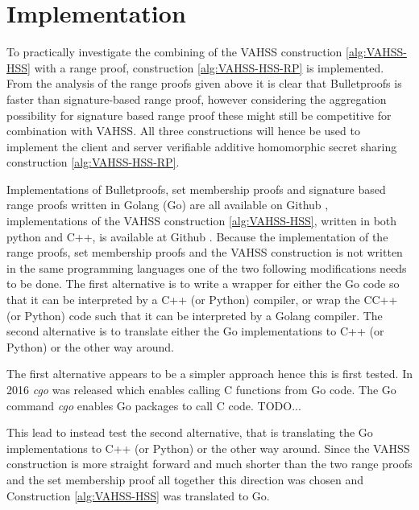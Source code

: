 \section{Implementation}
To practically investigate the combining of the VAHSS construction \ref{alg:VAHSS-HSS} with a range proof, construction \ref{alg:VAHSS-HSS-RP} is implemented. %
 From the analysis of the range proofs given above it is clear that Bulletproofs is faster than signature-based range proof, however considering the aggregation possibility for signature based range proof these might still be competitive for combination with VAHSS.  All three constructions will hence be used to implement the client and server verifiable additive homomorphic secret sharing construction \ref{alg:VAHSS-HSS-RP}. 

Implementations of Bulletproofs, set membership proofs and signature based range proofs written in Golang (Go) are all available on Github \cite{Git:RP}, implementations of the VAHSS construction \ref{alg:VAHSS-HSS}, written in both python and C++, is available at Github \cite{Git:python_vahss} \cite{Git:C_vahss}.
Because the implementation of the range proofs, set membership proofs and the VAHSS construction is not written in the same programming languages one of the two following modifications needs to be done. The first alternative is to write a wrapper for either the Go code so that it can be interpreted by a C++ (or Python) compiler, or wrap the CC++ (or Python) code such that it can be interpreted by a Golang compiler. The second alternative is to translate either the Go implementations to C++ (or Python) or the other way around. 

The first alternative appears to be a simpler approach hence this is first tested. In 2016 \textit{cgo} was released which enables calling C functions from Go code. 
The Go command \textit{cgo} enables Go packages to call C code. TODO...

This lead to instead test the second alternative, that is translating  the Go implementations to C++ (or Python) or the other way around. Since the VAHSS construction is more straight forward and much shorter than the two range proofs and the set membership proof all together this direction was chosen and Construction \ref{alg:VAHSS-HSS} was translated to Go.

